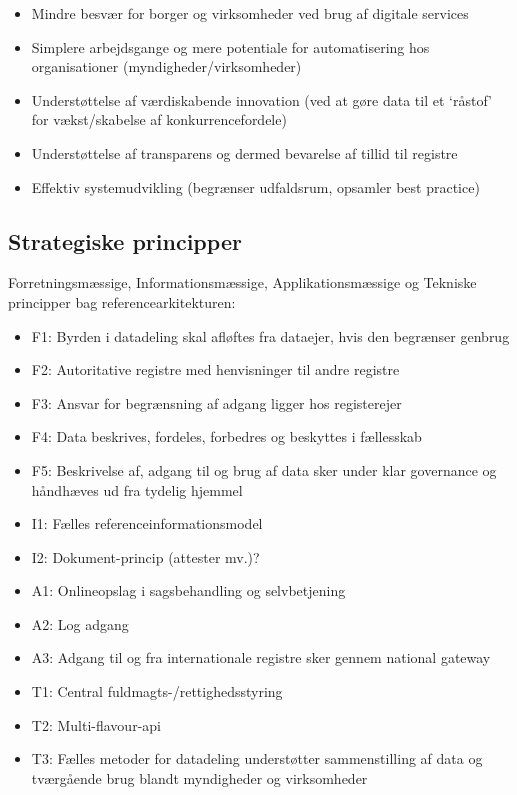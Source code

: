 \begin{itemize}
\tightlist
\item
  Mindre besvær for borger og virksomheder ved brug af digitale services
\item
  Simplere arbejdsgange og mere potentiale for automatisering hos
  organisationer (myndigheder/virksomheder)
\item
  Understøttelse af værdiskabende innovation (ved at gøre data til et
  `råstof' for vækst/skabelse af konkurrencefordele)
\item
  Understøttelse af transparens og dermed bevarelse af tillid til
  registre
\item
  Effektiv systemudvikling (begrænser udfaldsrum, opsamler best
  practice)
\end{itemize}

\subsection{Strategiske principper}\label{strategiske-principper}

Forretningsmæssige, Informationsmæssige, Applikationsmæssige og Tekniske
principper bag referencearkitekturen:

\begin{itemize}
\tightlist
\item
  F1: Byrden i datadeling skal afløftes fra dataejer, hvis den begrænser
  genbrug
\item
  F2: Autoritative registre med henvisninger til andre registre
\item
  F3: Ansvar for begrænsning af adgang ligger hos registerejer
\item
  F4: Data beskrives, fordeles, forbedres og beskyttes i fællesskab
\item
  F5: Beskrivelse af, adgang til og brug af data sker under klar
  governance og håndhæves ud fra tydelig hjemmel
\item
  I1: Fælles referenceinformationsmodel
\item
  I2: Dokument-princip (attester mv.)?
\item
  A1: Onlineopslag i sagsbehandling og selvbetjening
\item
  A2: Log adgang
\item
  A3: Adgang til og fra internationale registre sker gennem national
  gateway
\item
  T1: Central fuldmagts-/rettighedsstyring
\item
  T2: Multi-flavour-api
\item
  T3: Fælles metoder for datadeling understøtter sammenstilling af data
  og tværgående brug blandt myndigheder og virksomheder
\end{itemize}

